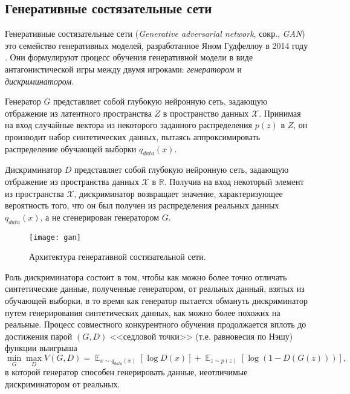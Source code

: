 
\subsection{Генеративные состязательные сети}

Генеративные состязательные сети (\emph{Generative adversarial network}, сокр., \emph{GAN})  это семейство генеративных моделей, разработанное Яном Гудфеллоу в 2014 году \cite{goodfellow2014generative}.  Они формулируют процесс обучения  генеративной модели в виде антагонистической игры между двумя игроками: \emph{генератором} и \emph{дискриминатором}.

Генератор $G$ представляет собой глубокую нейронную сеть, задающую отбражение из латентного пространства $Z$ в пространство данных $\mathcal X$.
Принимая на вход случайные вектора из некоторого заданного распределения $p(z)$ в $Z$, он производит набор синтетических данных, пытаясь аппроксимировать распределение обучающей выборки $q_{data}(x)$.

Дискриминатор $D$ представляет собой глубокую нейронную сеть, задающую отбражение из пространства данных $\mathcal X$ в $\mathbb R$. Получив на вход некоторый элемент из пространства $\mathcal X$, дискриминатор возвращает значение, характеризующее вероятность того, что он был получен из распределения реальных данных $q_{data}(x)$, а не сгенерирован генератором $G$.

\begin{figure}[h]
\begin{center}
    \texttt{[image: gan]}
    \caption{Архитектура генеративной состязательной сети.}
    \label{fig:subim11}
\end{center}
\end{figure}

Роль дискриминатора состоит в том, чтобы как можно более точно отличать синтетические данные, полученные генератором, от реальных данный, взятых из обучающей выборки, в то время как генератор пытается обмануть дискриминатор путем генерирования синтетических данных, как можно более похожих на реальные.
Процесс совместного конкурентного обучения продолжается вплоть до достижения парой $(G, D)$ <<седловой точки>> (т.е. равновесия по Нэшу) \cite{goodfellow2017nips} функции выигрыша
$$
\min_{G} \max_{D} V(G, D) = \mathop{\mathbb{E}}_{x \sim q_{data}(x)} [\log D(x)] + \mathop{\mathbb{E}}_{z \sim p(z)} [\log (1 - D(G(z)))] ,
$$
в которой генератор способен генерировать данные, неотличимые дискриминатором от реальных.

